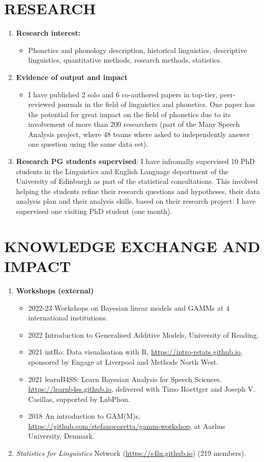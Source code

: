 \documentclass{article}
\begin{document}
\section{RESEARCH}

\begin{enumerate}
\item \textbf{Research interest:}
	\begin{itemize}
		\item Phonetics and phonology description, historical linguistics, descriptive linguistics, quantitative methods, research methods, statistics.
	\end{itemize}
\item \textbf{Evidence of output and impact}
	\begin{itemize}
		\item I have published 2 solo and 6 co-authored papers in top-tier, peer-reviewed journals in the field of linguistics and phonetics. One paper has the potential for great impact on the field of phonetics due to its involvement of more than 200 researchers (part of the Many Speech Analysis project, where 48 teams where asked to independently answer one question using the same data set).
	\end{itemize}
\item \textbf{Research PG students supervised}: I have infromally supervised 10 PhD students in the Linguistics and English Language department of the University of Edinburgh as part of the statistical consultations. This involved helping the students refine their research questions and hypotheses, their data analysis plan and their analysis skills, based on their research project. I have supervised one visiting PhD student (one month).
\end{enumerate}

\section{KNOWLEDGE EXCHANGE AND IMPACT}

\begin{enumerate}
\item \textbf{Workshops (external)}
	\begin{itemize}
  \item 2022-23 Workshops on Bayesian linear models and GAMMs at 4 international institutions.
  \item 2022 Introduction to Generalised Additive Models, University of Reading.
	\item 2021 intRo: Data visualisation with R, \url{https://intro-rstats.github.io}, sponsored by Engage at Liverpool and Methods North West.
	\item 2021 learnB4SS: Learn Bayesian Analysis for Speech Sciences. \url{https://learnb4ss.github.io}, delivered with Timo Roettger and Joseph V. Casillas, supported by LabPhon.
	\item 2018 An introduction to GAM(M)s, \url{https://github.com/stefanocoretta/gamm-workshop}, at Aarhus University, Denmark.
	\end{itemize}
\item \textit{Statistics for Linguistics} Network (\url{https://s4ln.github.io}) (219 members).
\end{enumerate}
\end{document}

